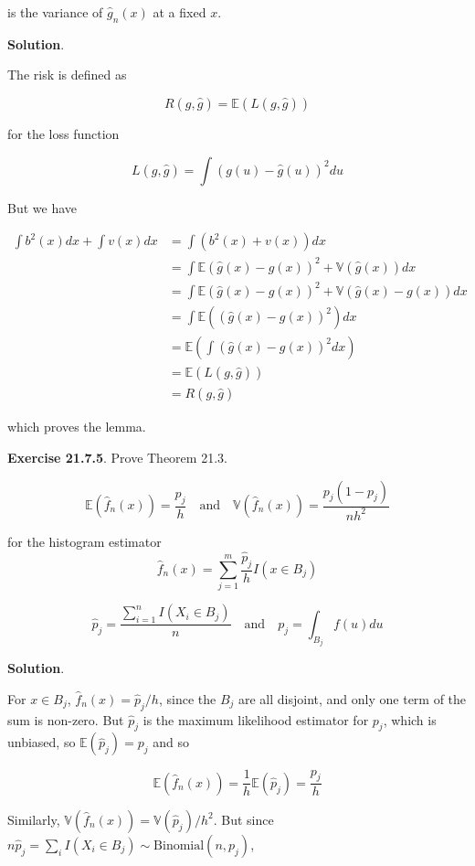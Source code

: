 is the variance of \(\hat{g}_{n}(x)\) at a fixed \(x\).

\textbf{Solution}.

The risk is defined as

\[ R(g, \hat{g}) = \mathbb{E}\left(L(g, \hat{g}) \right) \]

for the loss function

\[ L(g, \hat{g}) = \int (g(u) - \hat{g}(u))^{2} du\]

But we have

\begin{align*}
\int b^{2}(x) dx + \int v(x) dx &= \int (b^{2}(x) + v(x)) dx \\
&= \int \mathbb{E}(\hat{g}(x) - g(x))^{2} + \mathbb{V}(\hat{g}(x)) dx \\
&= \int \mathbb{E}(\hat{g}(x) - g(x))^{2} + \mathbb{V}(\hat{g}(x) - g(x)) dx \\
&= \int \mathbb{E}((\hat{g}(x) - g(x))^{2}) dx \\
&= \mathbb{E}\left(\int (\hat{g}(x) - g(x))^{2} dx \right) \\
&= \mathbb{E}(L(g, \hat{g})) \\
&=  R(g, \hat{g})
\end{align*}

which proves the lemma.

\textbf{Exercise 21.7.5}. Prove Theorem 21.3.

\[ 
\mathbb{E}(\hat{f}_{n}(x)) = \frac{p_{j}}{h} 
\quad \text{and} \quad
\mathbb{V}(\hat{f}_{n}(x)) = \frac{p_{j} (1 - p_{j})}{nh^{2}}
\]

for the histogram estimator
\[ \hat{f}_{n}(x) = \sum_{j=1}^m \frac{\hat{p}_{j}}{h} I(x \in B_{j}) \]

\[ \hat{p}_{j} = \frac{\sum_{i=1}^{n} I(X_{i} \in B_{j})}{n}
\quad \text{and} \quad
p_{j} = \int_{B_{j}} f(u) du \]

\textbf{Solution}.

For \(x \in B_{j}\), \(\hat{f}_{n}(x) = \hat{p}_{j} / h\), since the \(B_{j}\)
are all disjoint, and only one term of the sum is non-zero. But
\(\hat{p}_{j}\) is the maximum likelihood estimator for \(p_{j}\), which is
unbiased, so \(\mathbb{E}(\hat{p}_{j}) = p_{j}\) and so

\[\mathbb{E}(\hat{f}_{n}(x)) = \frac{1}{h} \mathbb{E}(\hat{p}_{j}) = \frac{p_{j}}{h}\]

Similarly, \(\mathbb{V}(\hat{f}_{n}(x)) = \mathbb{V}(\hat{p}_{j}) / h^{2}\).
But since
\(n \hat{p}_{j} = \sum_{i} I(X_{i} \in B_{j}) \sim \text{Binomial}(n, p_{j})\),

